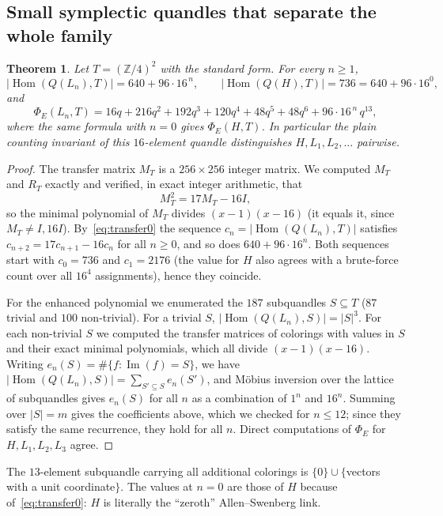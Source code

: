 \documentclass[11pt]{article}
\newtheorem{theorem}{Theorem}[section]
\theoremstyle{definition}
\newcommand{\Z}{\mathbb{Z}}
\newcommand{\Hom}{\operatorname{Hom}}
\renewcommand{\Im}{\operatorname{Im}}
\newcommand{\PhiE}{\Phi_E}
\begin{document}
\subsection{Small symplectic quandles that separate the whole family}\label{ssec:small}

\begin{theorem}\label{thm:Z4}
Let $T=(\Z/4)^2$ with the standard form. For every $n\ge1$,
\[
|\Hom(Q(L_n),T)|=640+96\cdot16^{\,n},\qquad |\Hom(Q(H),T)|=736=640+96\cdot16^{0},
\]
and
\[
\PhiE(L_n,T)=16q+216q^2+192q^3+120q^4+48q^5+48q^6+96\cdot16^{\,n}\,q^{13},
\]
where the same formula with $n=0$ gives $\PhiE(H,T)$. In particular the plain counting invariant of
this $16$-element quandle distinguishes $H,L_1,L_2,\dots$ pairwise.
\end{theorem}

\begin{proof}
The transfer matrix $M_T$ is a $256\times256$ integer matrix. We computed $M_T$ and $R_T$ exactly and
verified, in exact integer arithmetic, that
\[
M_T^2=17M_T-16I,
\]
so the minimal polynomial of $M_T$ divides $(x-1)(x-16)$ (it equals it, since $M_T\neq I,16I$).
By~\eqref{eq:transfer0} the sequence $c_n=|\Hom(Q(L_n),T)|$ satisfies $c_{n+2}=17c_{n+1}-16c_n$ for all
$n\ge0$, and so does $640+96\cdot16^n$. Both sequences start with $c_0=736$ and $c_1=2176$ (the value for
$H$ also agrees with a brute-force count over all $16^4$ assignments), hence they coincide.

For the enhanced polynomial we enumerated the $187$ subquandles $S\subseteq T$ ($87$ trivial and
$100$ non-trivial). For a trivial $S$, $|\Hom(Q(L_n),S)|=|S|^3$. For each non-trivial $S$ we computed
the transfer matrices of colorings with values in $S$ and their exact minimal polynomials, which all
divide $(x-1)(x-16)$. Writing $e_n(S)=\#\{f:\Im(f)=S\}$, we have
$|\Hom(Q(L_n),S)|=\sum_{S'\subseteq S}e_n(S')$, and M\"obius inversion over the lattice of subquandles
gives $e_n(S)$ for all $n$ as a combination of $1^n$ and $16^n$. Summing over $|S|=m$ gives the
coefficients above, which we checked for $n\le12$; since they satisfy the same recurrence, they hold for
all $n$. Direct computations of $\PhiE$ for $H,L_1,L_2,L_3$ agree.
\end{proof}

The $13$-element subquandle carrying all additional colorings is $\{0\}\cup\{$vectors with a unit
coordinate$\}$. The values at $n=0$ are those of $H$ because of~\eqref{eq:transfer0}: $H$ is literally the ``zeroth''
Allen--Swenberg link.
\end{document}

